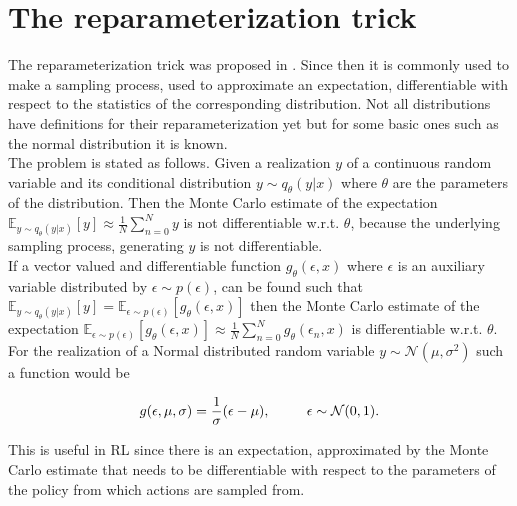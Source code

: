 \section{The reparameterization trick} \label{ssec:reparam}
The reparameterization trick was proposed in \cite{kingma2013autoencoding}. Since then it is commonly used to make a sampling process, used to approximate an expectation, differentiable with respect to the statistics of the corresponding distribution. Not all distributions have definitions for their reparameterization yet but for some basic ones such as the normal distribution it is known.\\
The problem is stated as follows. Given a realization $y$ of a continuous random variable and its conditional distribution $y\sim q_{\theta}(y|x)$ where $\theta$ are the parameters of the distribution. Then the Monte Carlo estimate of the expectation $\mathbb{E}_{y \sim q_{\theta}(y|x)}[y] \approx \frac{1}{N}\sum_{n=0}^N y$ is not differentiable w.r.t. $\theta$, because the underlying sampling process, generating $y$ is not differentiable.\\

If a vector valued and differentiable function $g_{\theta}(\epsilon, x)$ where $\epsilon$ is an auxiliary variable distributed by $\epsilon \sim p(\epsilon)$, can be found such that $\mathbb{E}_{y\sim q_{\theta}(y|x)}[y] = \mathbb{E}_{\epsilon\sim p(\epsilon)}[g_{\theta}(\epsilon, x)]$ then the Monte Carlo estimate of the expectation $\mathbb{E}_{\epsilon\sim p(\epsilon)}[g_{\theta}(\epsilon, x)] \approx \frac{1}{N}\sum_{n=0}^N g_{\theta}(\epsilon_n, x)$ is differentiable w.r.t. $\theta$.\\

For the realization of a Normal distributed random variable $y \sim \mathcal{N}(\mu, \sigma^2)$ such a function would be

\begin{align}
	g(\epsilon, \mu, \sigma) = \frac{1}{\sigma}(\epsilon - \mu), \text{\hspace{8mm} $\epsilon \sim \mathcal{N}(0, 1)$}.
\end{align}

This is useful in RL since there is an expectation, approximated by the Monte Carlo estimate that needs to be differentiable with respect to the parameters of the policy from which actions are sampled from.